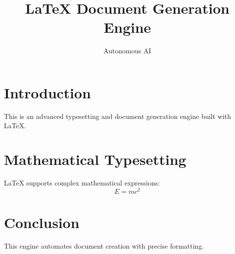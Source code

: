 \documentclass{article}
\title{LaTeX Document Generation Engine}
\author{Autonomous AI}
\date{}
\begin{document}
\maketitle

\section{Introduction}
This is an advanced typesetting and document generation engine built with LaTeX.

\section{Mathematical Typesetting}
LaTeX supports complex mathematical expressions:
\begin{equation}
E = mc^2
\end{equation}

\section{Conclusion}
This engine automates document creation with precise formatting.
\end{document}
